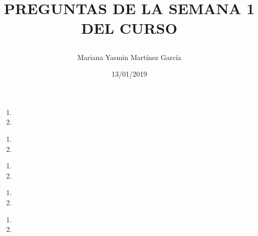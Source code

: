 \documentclass[letterpaper, 12pt, twoside]{article}
\title{\Huge\item\color{red}\textbf {PREGUNTAS DE LA SEMANA 1 DEL CURSO}}
\author{Mariana Yasmin Martínez García}
\date{13/01/2019}
\begin{document}
	\maketitle
	
	\newpage
	\title{\Large\color{red}}
	\begin{enumerate}
		\item 
		\item 
	\end{enumerate}

    \title{\Large\color{red}} 
    \begin{enumerate}
    	\item 
    	\item 
    \end{enumerate}

    \title{\Large\color{red}} 
    \begin{enumerate}
    	\item 
    	\item 
    \end{enumerate}

    \title{\Large\color{red}} 
    \begin{enumerate}
     	\item 
     	\item 
    \end{enumerate}

    \title{\Large\color{red}} 
    \begin{enumerate}
    	\item 
    	\item 
    \end{enumerate}
\end{document}
